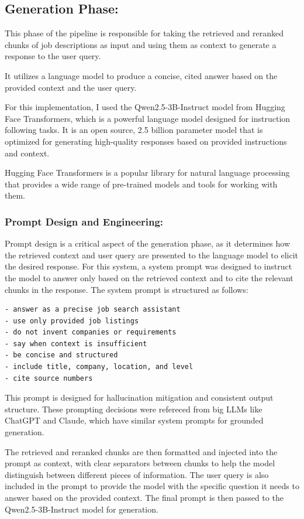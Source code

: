 ﻿\documentclass{article}
\begin{document}
\subsection{Generation Phase:}

This phase of the pipeline is responsible for taking the retrieved and reranked chunks of job descriptions as input and using them as context to generate a response to the user query.

It utilizes a language model to produce a concise, cited answer based on the provided context and the user query.

For this implementation, I used the Qwen2.5-3B-Instruct model from Hugging Face Transformers, which is a powerful language model designed for instruction following tasks.
It is an open source, 2.5 billion parameter model that is optimized for generating high-quality responses based on provided instructions and context.

Hugging Face Transformers is a popular library for natural language processing that provides a wide range of pre-trained models and tools for working with them.

\subsubsection*{Prompt Design and Engineering:}

Prompt design is a critical aspect of the generation phase, as it determines how the retrieved context and user query are presented to the language model to elicit the desired response.
For this system, a system prompt was designed to instruct the model to answer only based on the retrieved context and to cite the relevant chunks in the response.
The system prompt is structured as follows:
\begin{verbatim}
- answer as a precise job search assistant
- use only provided job listings
- do not invent companies or requirements
- say when context is insufficient
- be concise and structured
- include title, company, location, and level
- cite source numbers
\end{verbatim}

This prompt is designed for hallucination mitigation and consistent output structure.
These prompting decisions were refereced from big LLMs like ChatGPT and Claude, which have similar system prompts for grounded generation.

The retrieved and reranked chunks are then formatted and injected into the prompt as context, with clear separators between chunks to help the model distinguish between different pieces of information.
The user query is also included in the prompt to provide the model with the specific question it needs to answer based on the provided context.
The final prompt is then passed to the Qwen2.5-3B-Instruct model for generation.
\end{document}
